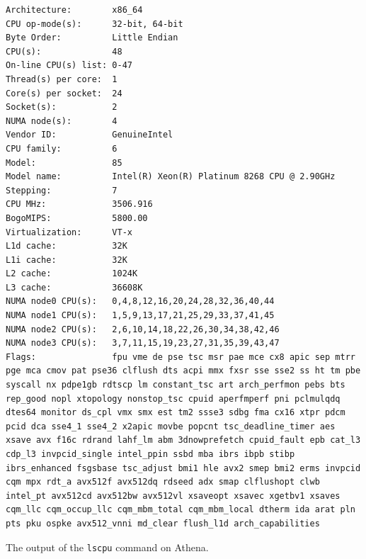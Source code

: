 \begin{listing}[H]
    \begin{verbatim}
Architecture:        x86_64
CPU op-mode(s):      32-bit, 64-bit
Byte Order:          Little Endian
CPU(s):              48
On-line CPU(s) list: 0-47
Thread(s) per core:  1
Core(s) per socket:  24
Socket(s):           2
NUMA node(s):        4
Vendor ID:           GenuineIntel
CPU family:          6
Model:               85
Model name:          Intel(R) Xeon(R) Platinum 8268 CPU @ 2.90GHz
Stepping:            7
CPU MHz:             3506.916
BogoMIPS:            5800.00
Virtualization:      VT-x
L1d cache:           32K
L1i cache:           32K
L2 cache:            1024K
L3 cache:            36608K
NUMA node0 CPU(s):   0,4,8,12,16,20,24,28,32,36,40,44
NUMA node1 CPU(s):   1,5,9,13,17,21,25,29,33,37,41,45
NUMA node2 CPU(s):   2,6,10,14,18,22,26,30,34,38,42,46
NUMA node3 CPU(s):   3,7,11,15,19,23,27,31,35,39,43,47
Flags:               fpu vme de pse tsc msr pae mce cx8 apic sep mtrr pge mca cmov pat pse36 clflush dts acpi mmx fxsr sse sse2 ss ht tm pbe syscall nx pdpe1gb rdtscp lm constant_tsc art arch_perfmon pebs bts rep_good nopl xtopology nonstop_tsc cpuid aperfmperf pni pclmulqdq dtes64 monitor ds_cpl vmx smx est tm2 ssse3 sdbg fma cx16 xtpr pdcm pcid dca sse4_1 sse4_2 x2apic movbe popcnt tsc_deadline_timer aes xsave avx f16c rdrand lahf_lm abm 3dnowprefetch cpuid_fault epb cat_l3 cdp_l3 invpcid_single intel_ppin ssbd mba ibrs ibpb stibp ibrs_enhanced fsgsbase tsc_adjust bmi1 hle avx2 smep bmi2 erms invpcid cqm mpx rdt_a avx512f avx512dq rdseed adx smap clflushopt clwb intel_pt avx512cd avx512bw avx512vl xsaveopt xsavec xgetbv1 xsaves cqm_llc cqm_occup_llc cqm_mbm_total cqm_mbm_local dtherm ida arat pln pts pku ospke avx512_vnni md_clear flush_l1d arch_capabilities
    \end{verbatim}
    \caption{The output of the \texttt{lscpu} command on Athena.}
    \label{listing:avon-lscpu}
\end{listing}
